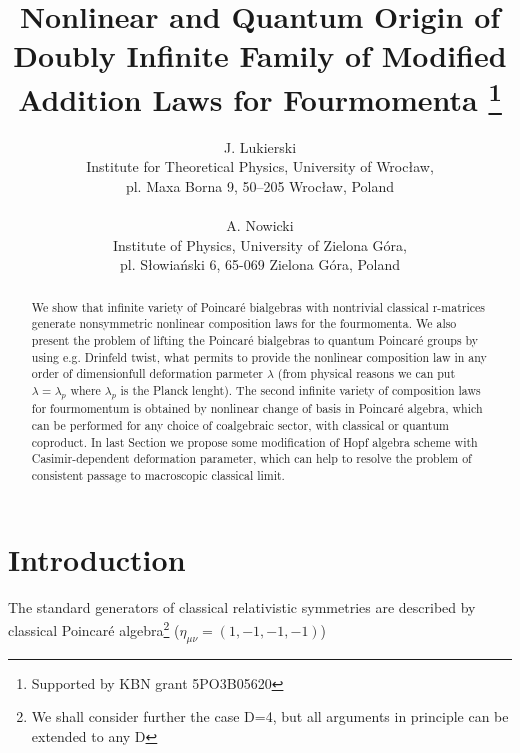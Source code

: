 \documentclass[a4paper,a4paper]{article}
\begin{document}
\title{Nonlinear and Quantum Origin of Doubly Infinite Family of 
Modified Addition Laws for 
Fourmomenta
\thanks{Supported by KBN grant 5PO3B05620}}
\author{J. Lukierski
\\
Institute for Theoretical Physics, University of Wroc{\l}aw,
 \\
 pl. Maxa Borna 9, 50--205 Wroc{\l}aw, Poland
 \\ \\
A. Nowicki
\\
Institute of Physics, University of Zielona G\'{o}ra,
 \\
 pl. S\l owia\'{n}ski 6, 65-069 Zielona G\'{o}ra, Poland}
\maketitle
\begin{abstract}
We show that infinite variety of Poincar\'{e} bialgebras with
nontrivial classical r-matrices generate nonsymmetric nonlinear
composition laws for the fourmomenta. We also present the 
problem
of lifting the Poincar\'{e} bialgebras to quantum Poincar\'{e}
groups by using e.g. Drinfeld twist, what permits to provide the
nonlinear composition law in any order of dimensionfull
deformation parmeter $\lambda$ (from physical reasons we can put
$\lambda = \lambda _{p}$ where $\lambda_{p}$ is the Planck
lenght). The second infinite variety of composition laws for
fourmomentum is obtained by nonlinear change of basis in
Poincar\'{e} algebra, which can be performed for any choice of
coalgebraic sector, with classical or quantum coproduct. In last
Section we propose some modification of Hopf algebra scheme with
Casimir-dependent deformation parameter, which can help to 
resolve
the problem of consistent passage to macroscopic classical limit.








\end{abstract}
\section{Introduction}

\renewcommand{\theequation}{\thesection.\arabic{equation}}

The standard generators of classical relativistic symmetries are
described by classical Poincar\'{e} algebra\footnote{We shall
consider further the case D=4, but all arguments in principle can
be extended to any D } ($\eta_{\mu\nu} = (1,-1,-1,-1)$)
\end{document}
